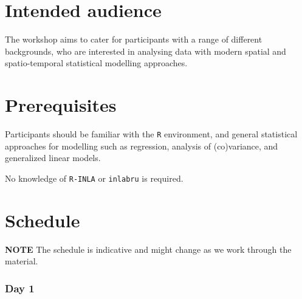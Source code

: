 \documentclass[
  letterpaper,
  DIV=11,
  numbers=noendperiod]{scrartcl}
\begin{document}
\section{Intended audience}\label{intended-audience}

The workshop aims to cater for participants with a range of different
backgrounds, who are interested in analysing data with modern spatial
and spatio-temporal statistical modelling approaches.

\section{Prerequisites}\label{prerequisites}

Participants should be familiar with the \texttt{R} environment, and
general statistical approaches for modelling such as regression,
analysis of (co)variance, and generalized linear models.\hspace{0pt}

No knowledge of \texttt{R-INLA} or \texttt{inlabru} is required.

\section{Schedule}\label{schedule-tabs}

\textbf{NOTE} The schedule is indicative and might change as we work
through the material.

\subsubsection{Day 1}
\end{document}

